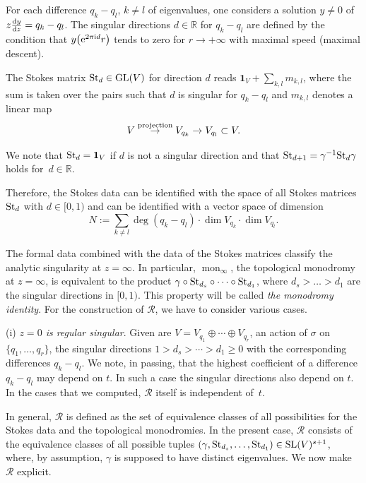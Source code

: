 \documentclass[pdftex]{sigma}
\numberwithin{equation}{section}
\begin{document}
For each difference $q_k-q_l$, $ k\neq l$ of eigenvalues, one considers
a solution $y\neq 0$ of $z\frac{{\rm d}y}{{\rm d}z}=q_k-q_l$. The singular directions $d\in \mathbb{R}$ for $q_k-q_l$
are defined by the condition that $y\bigl({\rm e}^{2\pi {\rm i} d}r\bigr)$ tends to zero for $r\rightarrow +\infty$ with maximal speed (maximal descent).

The Stokes matrix
${\rm St}_d\in {\rm GL}(V)$ for direction $d$ reads $\mathbf{1}_V +\sum _{k,l}m_{k,l}$, where the sum is taken over the pairs such that $d$ is singular for $q_k-q_l$ and $m_{k,l}$ denotes a linear map \[
V\stackrel{\rm projection}{\rightarrow}V_{q_k}\rightarrow V_{q_l}\subset V.\]

 We note that ${\rm St}_d={\bf 1}_V$ if $d$ is not a singular direction and that ${\rm St}_{d+1}=\gamma^{-1} {\rm St}_d \gamma$ holds for~${ d\in \mathbb{R}}$.

 Therefore, the Stokes data can be identified with the space of all Stokes matrices ${\rm St}_d$
with $d\in [0,1)$ and can be identified with a vector space of dimension
\[
N:=\sum _{k\neq l} \deg (q_k-q_l)\cdot \dim V_{q_k}\cdot \dim V_{q_l}.\]



The formal data combined with the data of the Stokes matrices classify the analytic singularity at $z=\infty$. In particular,
$\operatorname{mon}_\infty$, the topological monodromy at $z=\infty$, is equivalent to the product $\gamma \circ {\rm St}_{d_s}\circ \dots \circ {\rm St}_{d_1}$,
where $d_s>\dots >d_1$ are the singular directions in $[0,1)$. This property will be called {\it the monodromy identity}. For the construction of
$\mathcal{R}$, we have to consider various cases.

 (i) {\it $z=0$ is regular singular}. Given are $V=V_{q_1}\oplus \cdots \oplus V_{q_r}$, an action
of $\sigma$ on $\{q_1,\dots , q_r\}$, the singular directions $1>d_s> \cdots >d_1\geq 0$ with the corresponding differences
$q_k-q_l$. We note, in passing, that the highest coefficient of a difference $q_k-q_l$ may depend on $t$. In such a case the
singular directions also depend on $t$. In the cases that we computed, $\mathcal{R}$ itself is independent of~$t$.

In general, $\mathcal{R}$ is defined as the set of equivalence classes of all possibilities for the Stokes data and the
topological monodromies. In the present case, $\mathcal{R}$ consists of the equivalence classes of all possible tuples
$(\gamma, {\rm St}_{d_s},\dots , {\rm St}_{d_1})\in {\rm SL}(V)^{s+1}$, where, by assumption, $\gamma$ is supposed to have
distinct eigenvalues. We now make $\mathcal{R}$ explicit.
\end{document}
